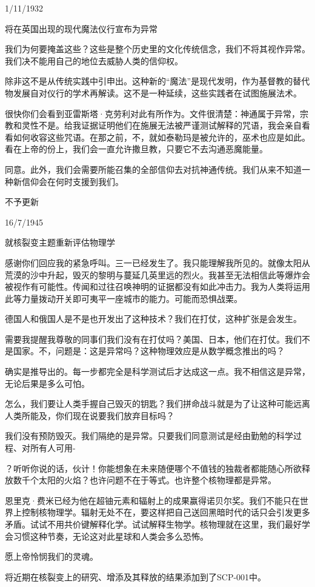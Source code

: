 \begin{scpbox}

1\slash 11\slash 1932

将在英国出现的现代魔法仪行宣布为异常


我们为何要掩盖这些？这些是整个历史里的文化传统信念，我们不将其视作异常。我们决不能用自己的地位去威胁人类的信仰权。

除非这不是从传统实践中引申出。这种新的“魔法”是现代发明，作为基督教的替代物发展自对仪行的学术再解读。这不是一种延续，这些实践者在试图施展法术。

很快你们会看到亚雷斯塔·克劳利对此有所作为。文件很清楚：神通属于异常，宗教和灵性不是。给我证据证明他们在施展无法被严谨测试解释的咒语，我会亲自看看如何收容这些咒语。在那之前，不，就如泰勒玛是被允许的，巫术也应是如此。看在上帝的份上，我们会一直允许撒旦教，只要它不去沟通恶魔能量。

同意。此外，我们会需要所能召集的全部信仰去对抗神通传统。我们从来不知道一种新信仰会在何时支援到我们。

不予更新

\end{scpbox}

\begin{scpbox}

16\slash 7\slash 1945

就核裂变主题重新评估物理学


感谢你们回应我的紧急呼叫。三一已经发生了。我只能理解我所见的。就像太阳从荒漠的沙中升起，毁灭的黎明与蔓延几英里远的烈火。我甚至无法相信此等爆炸会被视作有可能性。传闻和过往召唤神明的证据都没有如此冲击力。我为人类将运用此等力量拨动开关即可夷平一座城市的能力。可能而恐惧战栗。

德国人和俄国人是不是也开发出了这种技术？我们在打仗，这种扩张是会发生。

需要我提醒我尊敬的同事们我们没有在打仗吗？美国、日本，他们在打仗。我们不是国家。不，问题是：这是异常吗？这种物理效应是从数学概念推出的吗？

确实是推导出的。每一步都完全是科学测试后才达成这一点。我不相信这是异常，无论后果是多么可怕。

怎么，我们要让人类手握自己毁灭的钥匙？我们拼命战斗就是为了让这种可能远离人类所能及，你们现在说要我们放弃目标吗？

我们没有预防毁灭。我们隔绝的是异常。只要我们同意测试是经由勤勉的科学过程、对所有人可用-

？听听你说的话，伙计！你能想象在未来随便哪个不值钱的独裁者都能随心所欲释放数千个太阳的火焰？也许问题不在于等式。也许整个核物理都是异常。

恩里克·费米已经为他在超铀元素和辐射上的成果赢得诺贝尔奖。我们不能只在世界上控制核物理学。辐射无处不在，要这样把自己送回黑暗时代的话只会引发更多矛盾。试试不用共价键解释化学。试试解释生物学。核物理就在这里，我们最好学会习惯这种节奏，无论这对此星球和人类会多么恐怖。

愿上帝怜悯我们的灵魂。

将近期在核裂变上的研究、增添及其释放的结果添加到了SCP-001中。

\end{scpbox}

